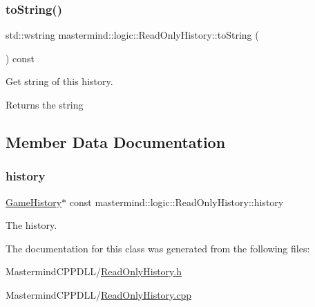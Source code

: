 \subsubsection{\texorpdfstring{to\+String()}{toString()}}
{\footnotesize\ttfamily std\+::wstring mastermind\+::logic\+::\+Read\+Only\+History\+::to\+String (\begin{DoxyParamCaption}{ }\end{DoxyParamCaption}) const}



Get string of this history. 

\begin{DoxyReturn}{Returns}
the string 
\end{DoxyReturn}


\subsection{Member Data Documentation}
\hypertarget{classmastermind_1_1logic_1_1_read_only_history_a95e89bc90b14b6b6a6ddcc48268344ce}{}\label{classmastermind_1_1logic_1_1_read_only_history_a95e89bc90b14b6b6a6ddcc48268344ce} 
\subsubsection{\texorpdfstring{history}{history}}
{\footnotesize\ttfamily \hyperlink{classmastermind_1_1logic_1_1_game_history}{Game\+History}$\ast$ const mastermind\+::logic\+::\+Read\+Only\+History\+::history\hspace{0.3cm}{\ttfamily [private]}}



The history. 



The documentation for this class was generated from the following files\+:\begin{DoxyCompactItemize}
\item 
Mastermind\+C\+P\+P\+D\+L\+L/\hyperlink{_read_only_history_8h}{Read\+Only\+History.\+h}\item 
Mastermind\+C\+P\+P\+D\+L\+L/\hyperlink{_read_only_history_8cpp}{Read\+Only\+History.\+cpp}\end{DoxyCompactItemize}
